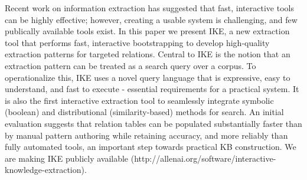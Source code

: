 Recent work on information extraction has suggested that fast, interactive tools can be highly effective; however, creating a usable system is challenging, and few publically available tools exist. In this paper we present IKE, a new extraction tool that performs fast, interactive bootstrapping to develop high-quality extraction patterns for targeted relations. Central to IKE is the notion that an extraction pattern can be treated as a search query over a corpus. To operationalize this, IKE uses a novel query language that is expressive, easy to understand, and fast to execute - essential requirements for a practical system. It is also the first interactive extraction tool to seamlessly integrate symbolic (boolean) and distributional (similarity-based) methods for search. An initial evaluation suggests that relation tables can be populated substantially faster than by manual pattern authoring while retaining accuracy, and more reliably than fully automated tools, an important step towards practical KB construction. We are making IKE publicly available (http://allenai.org/software/interactive-knowledge-extraction).
